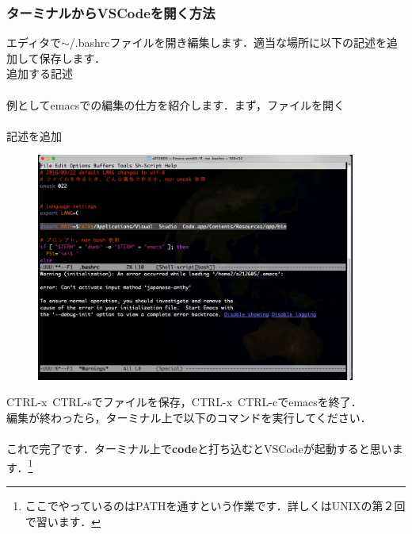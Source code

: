 \documentclass{jarticle}
\begin{document}
\subsubsection{ターミナルからVSCodeを開く方法}
エディタで$\sim$/.bashrcファイルを開き編集します．適当な場所に以下の記述を追加して保存します．\\

追加する記述\\
\quad \quad {}\\

例としてemacsでの編集の仕方を紹介します．まず，ファイルを開く\\
\quad \quad {}\\

記述を追加

\begin{figure}[H]
  \centering
  \includegraphics[height=7.5cm]{fig/VSCode5.png}
\end{figure}
CTRL-x\ CTRL-sでファイルを保存，CTRL-x\ CTRL-cでemacsを終了．\\

編集が終わったら，ターミナル上で以下のコマンドを実行してください．\\

\quad \quad {}\\

これで完了です．ターミナル上で{\bf{code}}と打ち込むとVSCodeが起動すると思います．\footnote{ここでやっているのはPATHを通すという作業です．詳しくはUNIXの第２回で習います．}
\end{document}
